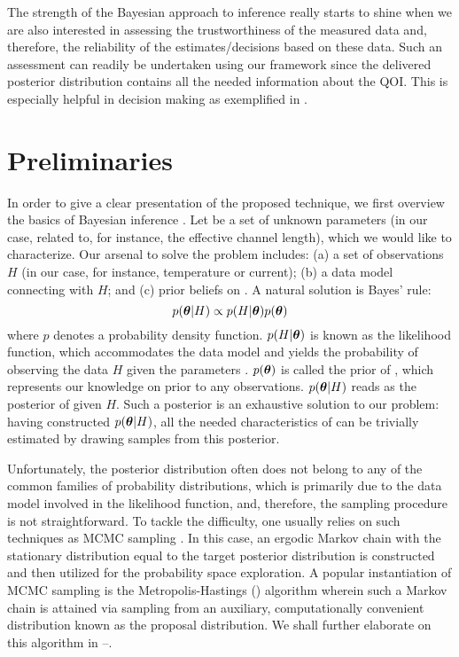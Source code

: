 The strength of the Bayesian approach to inference really starts to shine when
we are also interested in assessing the trustworthiness of the measured data
and, therefore, the reliability of the estimates/decisions based on these data.
Such an assessment can readily be undertaken using our framework since the
delivered posterior distribution contains all the needed information about the
\ac{QOI}. This is especially helpful in decision making as exemplified in
.

\section{Preliminaries}

In order to give a clear presentation of the proposed technique, we first
overview the basics of Bayesian inference \cite{gelman2004}. Let \vt be a set of
unknown parameters (in our case, related to, for instance, the effective channel
length), which we would like to characterize. Our arsenal to solve the problem
includes: (a) a set of observations $H$ (in our case, for instance, temperature
or current); (b) a data model connecting \vt with $H$; and (c) prior beliefs on
\vt. A natural solution is Bayes' rule:
\begin{equation} \elab{bayes-theorem}
  p(\vt | H) \propto p(H | \vt) p(\vt)
\end{equation}
where $p$ denotes a probability density function. $p(H | \boldsymbol{\theta})$ is known as the
likelihood function, which accommodates the data model and yields the
probability of observing the data $H$ given the parameters \vt. $p(\boldsymbol{\theta})$ is
called the prior of \vt, which represents our knowledge on \vt prior to any
observations. $p(\boldsymbol{\theta} | H)$ reads as the posterior of \vt given $H$. Such a
posterior is an exhaustive solution to our problem: having constructed $p(\boldsymbol{\theta} |
H)$, all the needed characteristics of \vt can be trivially estimated by drawing
samples from this posterior.

Unfortunately, the posterior distribution often does not belong to any of the
common families of probability distributions, which is primarily due to the data
model involved in the likelihood function, and, therefore, the sampling
procedure is not straightforward. To tackle the difficulty, one usually relies
on such techniques as \ac{MCMC} sampling \cite{gelman2004}. In this case, an
ergodic Markov chain with the stationary distribution equal to the target
posterior distribution is constructed and then utilized for the probability
space exploration. A popular instantiation of \ac{MCMC} sampling is the
Metropolis-Hastings () algorithm wherein such a Markov chain is attained
via sampling from an auxiliary, computationally convenient distribution known as
the proposal distribution. We shall further elaborate on this algorithm in
--.

